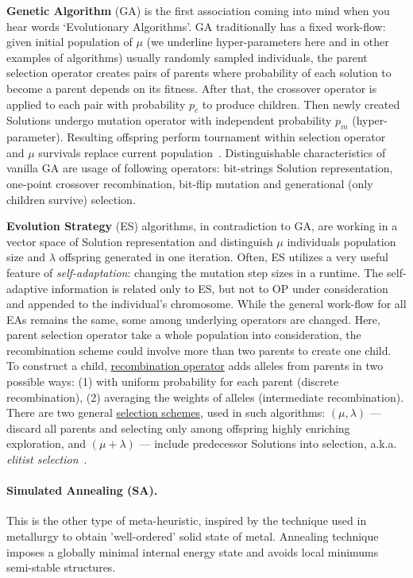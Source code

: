 \textbf{Genetic Algorithm} (GA) is the first association coming into mind when you hear words `Evolutionary Algorithms'. GA traditionally has a fixed work-flow: given initial population of \underline{$\mu$} (we underline hyper-parameters here and in other examples of algorithms) usually randomly sampled individuals, the parent selection operator creates pairs of parents where probability of each solution to become a parent depends on its fitness. After that, the crossover operator is applied to each pair with probability \underline{$p_c$} to produce children. Then newly created Solutions undergo mutation operator with independent probability \underline{$p_m$} (hyper-parameter). Resulting offspring perform tournament within selection operator and \underline{$\mu$} survivals replace current population~\cite{eiben2015popular}. Distinguishable characteristics of vanilla GA are usage of following operators: bit-strings Solution representation, one-point crossover recombination, bit-flip mutation and generational (only children survive) selection.

\textbf{Evolution Strategy} (ES) algorithms, in contradiction to GA, are working in a vector space of Solution representation and distinguish \underline{$\mu$} individuals population size and \underline{$\lambda$} offspring generated in one iteration. Often, ES utilizes a very useful feature of \textit{self-adaptation}: changing the mutation step sizes in a runtime. The self-adaptive information is related only to ES, but not to OP under consideration and appended to the individual's chromosome. While the general work-flow for all EAs remains the same, some among underlying operators are changed. Here, parent selection operator take a whole population into consideration, the recombination scheme could involve more than two parents to create one child. To construct a child, \underline{recombination operator} adds alleles from parents in two possible ways: (1) with uniform probability for each parent (discrete recombination), (2) averaging the weights of alleles (intermediate recombination). There are two general \underline{selection schemes}, used in such algorithms: $(\mu,\lambda)$ — discard all parents and selecting only among offspring highly enriching exploration, and $(\mu+\lambda)$ — include predecessor Solutions into selection, a.k.a. \textit{elitist selection}~\cite{eiben2015popular}.

\paragraph{Simulated Annealing (SA).} This is the other type of meta-heuristic, inspired by the technique used in metallurgy to obtain 'well-ordered' solid state of metal. Annealing technique imposes a globally minimal internal energy state and avoids local minimums semi-stable structures. 

